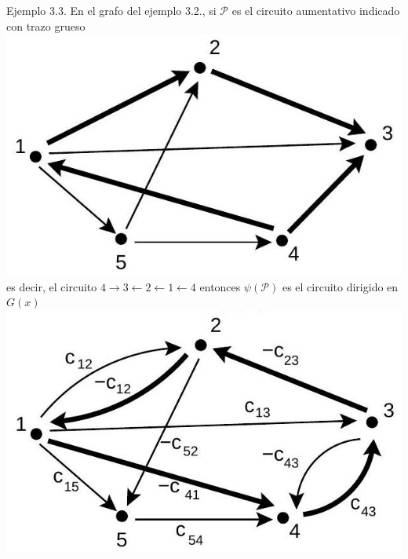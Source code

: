 \documentclass[10pt]{article}
\begin{document}
Ejemplo 3.3. En el grafo del ejemplo 3.2., si $\mathcal{P}$ es el circuito aumentativo indicado con trazo grueso\\
\includegraphics[max width=\textwidth, center]{2025_09_05_955b52bfc43174a24a9ag-13(2)}\\
es decir, el circuito $4 \longrightarrow 3 \longleftarrow 2 \longleftarrow 1 \longleftarrow 4$ entonces $\psi(\mathcal{P})$ es el circuito dirigido en $G(x)$\\
\includegraphics[max width=\textwidth, center]{2025_09_05_955b52bfc43174a24a9ag-13}
\end{document}

